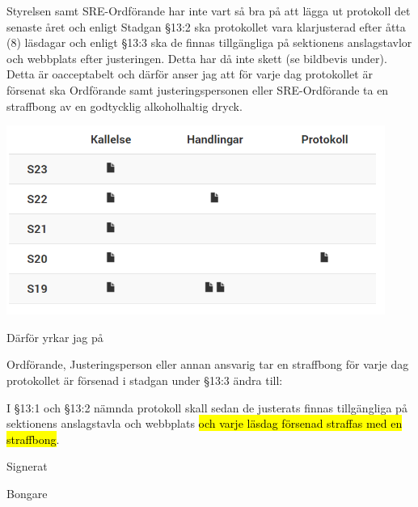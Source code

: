 \documentclass[../_main/handlingar.tex]{subfiles}
\begin{document}
Styrelsen samt SRE-Ordförande har inte vart så bra på att lägga ut protokoll det senaste året och
enligt Stadgan \S13:2 ska protokollet vara klarjusterad efter åtta (8) läsdagar och enligt §13:3 ska de
finnas tillgängliga på sektionens anslagstavlor och webbplats efter justeringen. Detta har då inte
skett (se bildbevis under). Detta är oacceptabelt och därför anser jag att för varje dag protokollet är
försenat ska Ordförande samt justeringspersonen eller SRE-Ordförande ta en straffbong av en
godtycklig alkoholhaltig dryck.

\begin{center}
  \includegraphics{../_res/protokoll.png}
\end{center}

Därför yrkar jag på

\begin{attsatser}
\att Ordförande, Justeringsperson eller annan ansvarig tar en straffbong för varje dag protokollet är
försenad
\att i stadgan under \S13:3 ändra till:\par
I \S13:1 och \S13:2 nämnda protokoll skall sedan de justerats finnas
tillgängliga på sektionens anslagstavla och webbplats \hl{och varje läsdag försenad straffas med en straffbong}.
\changenote
\end{attsatser}
\begin{signatures}{1}
    Signerat
    \signature{Godtycklig Sektionsmedlem}{Bongare}
\end{signatures}
\end{document}
